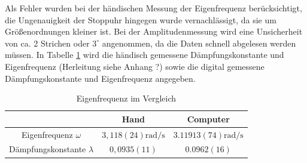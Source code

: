 \documentclass[11pt, a4paper]{article}
\begin{document}
    Als Fehler wurden bei der händischen Messung der Eigenfrequenz berücksichtigt, die Ungenauigkeit der Stoppuhr hingegen
    wurde vernachlässigt, da sie um Größenordnungen kleiner ist. Bei der Amplitudenmessung wird eine Unsicherheit von ca. 2 Strichen
    oder $3^{\circ}$ angenommen, da die Daten schnell abgelesen werden müssen.
    In Tabelle \ref{Tab:tableeig} wird die händisch gemessene Dämpfungskonstante und Eigenfrequenz (Herleitung siehe Anhang ?) sowie die
    digital gemessene Dämpfungskonstante und Eigenfrequenz angegeben. 
    \begin{table}[H]
        \centering
        \begin{tabular}{c c c} 
            & Hand & Computer \\ \hline
            Eigenfrequenz $\omega$ & $3,118(24) \si{\radian\per\second}$ & $3.11913(74) \si{\radian\per\second}$ \\
            Dämpfungskonstante $\lambda$ & $0,0935(11)$ & $0.0962(16)$

            
        \end{tabular}
        \caption{Eigenfrequenz im Vergleich}
        \label{Tab:tableeig}
    \end{table}
\end{document}
